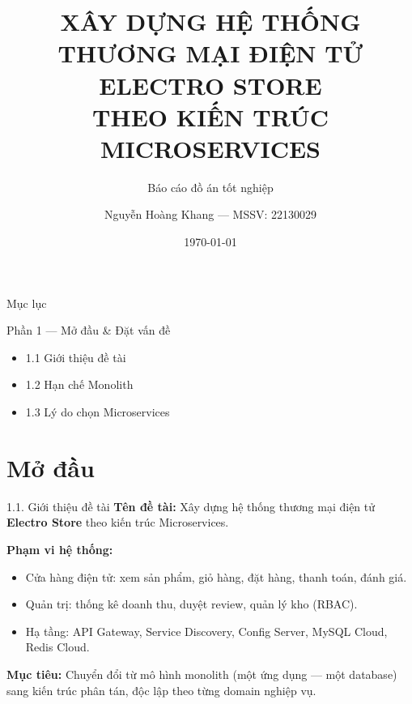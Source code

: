 \documentclass[aspectratio=169,12pt]{beamer}
\title[Hệ thống Microservices]{XÂY DỰNG HỆ THỐNG\\THƯƠNG MẠI ĐIỆN TỬ ELECTRO STORE\\THEO KIẾN TRÚC MICROSERVICES}
\subtitle{Báo cáo đồ án tốt nghiệp}
\author{Nguyễn Hoàng Khang — MSSV: 22130029}
\institute{Trường Đại học ... — Khoa Công nghệ Thông tin}
\date{\today}
\begin{document}
\begin{frame}
  \titlepage
\end{frame}

\begin{frame}{Mục lục}
  \tableofcontents
\end{frame}

\begin{frame}{Phần 1 — Mở đầu \& Đặt vấn đề}
  \begin{itemize}
    \item 1.1 Giới thiệu đề tài
    \item 1.2 Hạn chế Monolith
    \item 1.3 Lý do chọn Microservices
  \end{itemize}
\end{frame}

\section{Mở đầu}

\begin{frame}{1.1. Giới thiệu đề tài}
  \textbf{Tên đề tài:} Xây dựng hệ thống thương mại điện tử \textbf{Electro Store} theo kiến trúc Microservices.

  \vspace{0.6em}
  \textbf{Phạm vi hệ thống:}
  \begin{itemize}
    \item Cửa hàng điện tử: xem sản phẩm, giỏ hàng, đặt hàng, thanh toán, đánh giá.
    \item Quản trị: thống kê doanh thu, duyệt review, quản lý kho (RBAC).
    \item Hạ tầng: API Gateway, Service Discovery, Config Server, MySQL Cloud, Redis Cloud.
  \end{itemize}

  \vspace{0.4em}
  \textbf{Mục tiêu:} Chuyển đổi từ mô hình monolith (một ứng dụng — một database) sang kiến trúc phân tán, độc lập theo từng domain nghiệp vụ.
\end{frame}
\end{document}
